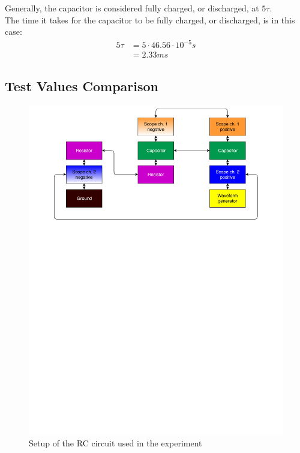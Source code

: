 \noindent Generally, the capacitor is considered fully charged, or discharged, at $5\tau$. \\
The time it takes for the capacitor to be fully charged, or discharged, is in this case:
\begin{align*}
5\tau &= 5 \cdot 46.56 \cdot 10^{-5} s \\
&= 2.33 ms
\end{align*}

\subsection{Test Values Comparison}
\begin{figure}[H]
	\center
		\includegraphics[clip, trim=0cm 18cm 0cm 0cm, scale=0.6]{fig/img/test_circuit_1}
	\caption{Setup of the RC circuit used in the experiment}
	\label{rc_flow}
\end{figure}
